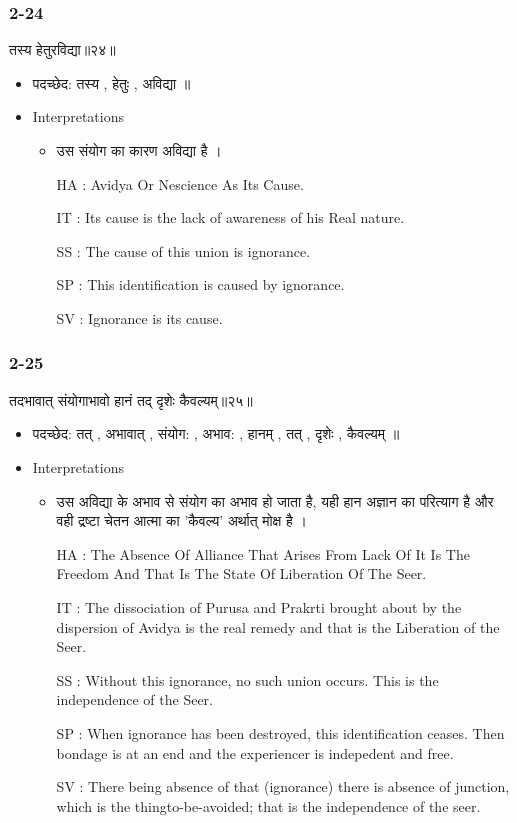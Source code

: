 \begin{frame}[fragile]\frametitle{2-24}
\begin{sanskrit}
तस्य हेतुरविद्या॥२४॥
\end{sanskrit}

	\begin{itemize}
	\item पदच्छेद: तस्य , हेतुः , अविद्या ॥
	\item Interpretations
		\begin{itemize}
		\item उस संयोग का कारण अविद्या है ।
		\item [HA]: Avidya Or Nescience As Its Cause.
		\item [IT]: Its cause is the lack of awareness of his Real nature.
		\item [SS]: The cause of this union is ignorance.
		\item [SP]: This identification is caused by ignorance.
		\item [SV]: Ignorance is its cause. 
		\end{itemize}
	\end{itemize}
	
\end{frame}

\begin{frame}[fragile]\frametitle{2-25}
\begin{sanskrit}
तदभावात् संयोगाभावो हानं तद् दृशेः कैवल्यम्॥२५॥
\end{sanskrit}

	\begin{itemize}
	\item पदच्छेद: तत् , अभावात् , संयोग: , अभाव: , हानम् , तत् , दृशेः , कैवल्यम् ॥
	\item Interpretations
		\begin{itemize}
		\item उस अविद्या के अभाव से संयोग का अभाव हो जाता है, यही हान अज्ञान का परित्याग है और वही द्रष्टा चेतन आत्मा का 'कैवल्य' अर्थात् मोक्ष है ।
		\item [HA]: The Absence Of Alliance That Arises From Lack Of It Is The Freedom And That Is The State Of Liberation Of The Seer.
		\item [IT]: The dissociation of Purusa and Prakrti brought about by the dispersion of Avidya is the real remedy and that is the Liberation of the Seer.
		\item [SS]: Without this ignorance, no such union occurs. This is the independence of the Seer.
		\item [SP]: When ignorance has been destroyed, this identification ceases. Then bondage is at an end and the experiencer is indepedent and free.
		\item [SV]: There being absence of that (ignorance) there is absence of junction, which is the thingto-be-avoided; that is the independence of the seer. 
		\end{itemize}
	\end{itemize}
	
\end{frame}

